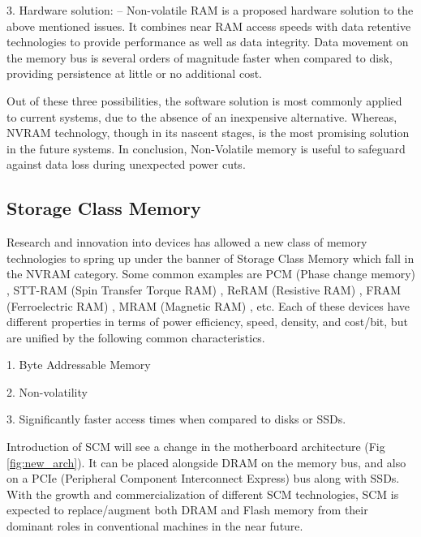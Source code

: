 3. Hardware solution: -- Non-volatile RAM is a proposed hardware solution to the above mentioned issues. It combines near RAM access speeds with data retentive technologies to provide performance as well as data integrity. Data movement on the memory bus is several orders of magnitude faster when compared to disk, providing persistence at little or no additional cost.

Out of these three possibilities, the software solution is most commonly applied to current systems, due to the absence of an inexpensive alternative. Whereas, NVRAM technology, though in its nascent stages, is the most promising solution in the future systems. In conclusion, Non-Volatile memory is useful to safeguard against data loss during unexpected power cuts. 

\subsection{Storage Class Memory}

Research and innovation into devices has allowed a new class of memory technologies to spring up under the banner of Storage Class Memory which fall in the NVRAM category. Some common examples are PCM (Phase change memory) \cite{pcm}, STT-RAM (Spin Transfer Torque RAM) \cite{sttram}, ReRAM (Resistive RAM) \cite{reram1} \cite{reram2}, FRAM (Ferroelectric RAM) \cite{feram}, MRAM (Magnetic RAM) \cite{mram1} \cite{mram2}, etc. Each of these devices have different properties in terms of power efficiency, speed, density, and cost/bit, but are unified by the following common characteristics.

1. Byte Addressable Memory

2. Non-volatility

3. Significantly faster access times when compared to disks or SSDs.

Introduction of SCM will see a change in the motherboard architecture (Fig \ref{fig:new_arch}). It can be placed alongside DRAM on the memory bus, and also on a PCIe (Peripheral Component Interconnect Express) bus along with SSDs. With the growth and commercialization of different SCM technologies, SCM is expected to replace/augment both DRAM and Flash memory from their dominant roles in conventional machines in the near future. 

\setlength{\belowcaptionskip}{-10pt}

